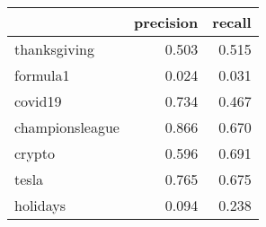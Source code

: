 \begin{tabular}{lrr}
\toprule
{} &  precision &  recall \\
\midrule
thanksgiving    &      0.503 &   0.515 \\
formula1        &      0.024 &   0.031 \\
covid19         &      0.734 &   0.467 \\
championsleague &      0.866 &   0.670 \\
crypto          &      0.596 &   0.691 \\
tesla           &      0.765 &   0.675 \\
holidays        &      0.094 &   0.238 \\
\bottomrule
\end{tabular}
